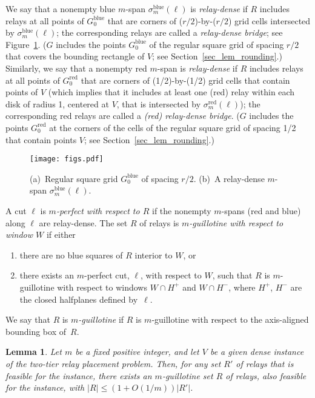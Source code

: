\documentclass[11pt,a4paper]{article}
\newcommand{\s}[1]{{\lvert #1 \rvert}}
\newcommand{\blue}{\text{blue}}
\newcommand{\red}{\text{red}}
\newtheorem{lemma}{Lemma}
\theoremstyle{definition}
\theoremstyle{remark}
\begin{document}
We say that a nonempty blue
$m$-span $\sigma_m^{\blue}(\ell)$ is {\em relay-dense}
if $R$ includes relays at
all points of $G_0^{\blue}$ that are corners of ($r/2$)-by-($r/2$) grid cells intersected
by  $\sigma_m^{\blue}(\ell)$; the corresponding relays are called a {\em relay-dense bridge}; see Figure~\ref{fig:densebridge}.  ($G$ includes the points $G_0^{\blue}$ of the regular square grid of spacing
$r/2$ that covers the bounding rectangle of $V$; see
Section~\ref{sec_lem_rounding}.)
Similarly, we say that a nonempty red $m$-span is {\em relay-dense} if
$R$ includes relays
at all points of $G_0^{\red}$ that are corners of (1/2)-by-(1/2) grid cells that contain points of $V$
(which implies that it includes at least one (red) relay within each disk of radius 1,
centered at $V$, that is intersected by $\sigma_m^{\red}(\ell)$);
the corresponding red relays are called a {\em (red) relay-dense bridge}.
($G$ includes the points $G_0^{\red}$ at the corners of the cells of the regular square grid of spacing 1/2 that contain points $V$;
see Section~\ref{sec_lem_rounding}.)

\begin{figure}\centering
\texttt{[image: figs.pdf]}
\caption{(a)~Regular square grid $G_0^{\blue}$ of spacing $r/2$. (b)~A relay-dense $m$-span $\sigma_m^{\blue}(\ell)$.}\label{fig:densebridge}
\end{figure}

A cut $\ell$ is {\em $m$-perfect with respect to $R$} if
the nonempty $m$-spans (red and blue) along $\ell$ are relay-dense.
The set $R$ of relays is {\em $m$-guillotine
  with respect to window $W$} if either
\begin{enumerate}
    \item there are no blue squares of $R$ interior to $W$, or
    \item there exists an $m$-perfect cut, $\ell$, with respect to
      $W$, such that $R$ is $m$-guillotine with respect to windows
      $W\cap H^+$ and $W\cap H^-$, where $H^+$, $H^-$ are the closed
      halfplanes defined by~$\ell$.
\end{enumerate}
We say that $R$ is {\em $m$-guillotine} if $R$ is $m$-guillotine with
respect to the axis-aligned bounding box of~$R$.

\begin{lemma}\label{lem_guillotine_relays}
Let $m$ be a fixed positive integer, and let $V$ be a given dense
instance of the two-tier relay placement problem.  Then, for any set
$R'$ of relays that is feasible for the instance, there exists an
$m$-guillotine set $R$ of relays, also feasible for the instance, with
$\s{R}\leq (1+O(1/m))\s{R'}$.
\end{lemma}
\end{document}
